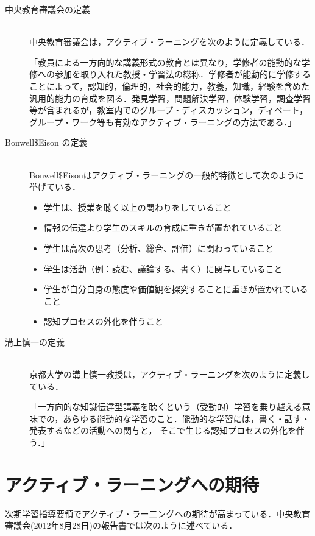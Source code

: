 \begin{description}

 \item [中央教育審議会の定義]\mbox{}\\
 中央教育審議会は，アクティブ・ラーニングを次のように定義している\cite{中央教育審議会の定義}．

	   「教員による一方向的な講義形式の教育とは異なり，学修者の能動的な学修への参加を取り入れた教授・学習法の総称．学修者が能動的に学修することによって，認知的，倫理的，社会的能力，教養，知識，経験を含めた汎用的能力の育成を図る．発見学習，問題解決学習，体験学習，調査学習等が含まれるが，教室内でのグループ・ディスカッション，ディベート，グループ・ワーク等も有効なアクティブ・ラーニングの方法である．」

 \item [Bonwell\$Eison の定義]\mbox{}\\
Bonwell\$Eisonはアクティブ・ラーニングの一般的特徴として次のように挙げている．
 
	       \begin{itemize}
	         \item 学生は、授業を聴く以上の関わりをしていること
	         \item 情報の伝達より学生のスキルの育成に重きが置かれていること
	         \item 学生は高次の思考（分析、総合、評価）に関わっていること
	         \item 学生は活動（例：読む、議論する、書く）に関与していること
	         \item 学生が自分自身の態度や価値観を探究することに重きが置かれていること
	         \item 認知プロセスの外化を伴うこと
	        \end{itemize}

 \item [溝上慎一の定義]\mbox{}\\
  京都大学の溝上慎一教授は，アクティブ・ラーニングを次のように定義している．
 
	    「一方向的な知識伝達型講義を聴くという（受動的）学習を乗り越える意味での，あらゆる能動的な学習のこと．能動的な学習には，書く・話す・発表するなどの活動への関与と， そこで生じる認知プロセスの外化を伴う．」

\end{description}

\section{アクティブ・ラーニングへの期待}
次期学習指導要領でアクティブ・ラー二ングへの期待が高まっている．中央教育審議会(2012年8月28日)の報告書では次のように述べている．

